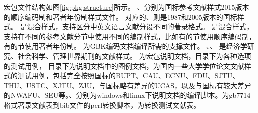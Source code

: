\documentclass[11pt]{article} %
\begin{document}
宏包文件结构如图\ref{fig:pkg:structure}所示。
、分别为国标参考文献样式2015版本的顺序编码制和著者年份制样式文件。
对应的、则是1987和2005版本的国标样式。
是混合样式，支持区分中英文语言文献分设不同的著录格式。
是混合样式，支持在不同的参考文献分节中使用不同的编制样式，比如有的节使用顺序编码制，有的节使用著者年份制。
为GBK编码文档编译所需的支撑文件。
、、 是经济学研究、社会科学、管理世界期刊的文献样式。%
 为宏包说明文档，目录下为各种选项的测试用例，
目录下为说明文档中的图例文档，为国内一些大学学位论文文献样式的测试用例，包括完全按照国标的BUPT、CAU、ECNU、FDU、SJTU、THU、USTC、XJTU、ZJU，与国标略有差异的UCAS，以及与国标有较大差异的NWAFU、SEU等。、分别为windows和linux下说明文档的编译脚本。为gb7714格式著录文献表到bib文件的perl转换脚本，为转换测试文献表。
\end{document}
